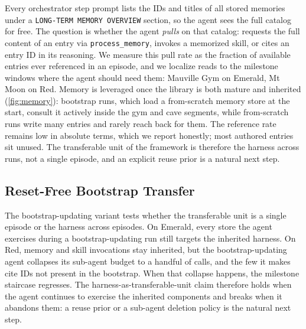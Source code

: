 Every orchestrator step prompt lists the IDs and titles of all stored memories under a \texttt{LONG-TERM MEMORY OVERVIEW} section, so the agent sees the full catalog for free. The question is whether the agent \emph{pulls} on that catalog: requests the full content of an entry via \texttt{process\_memory}, invokes a memorized skill, or cites an entry ID in its reasoning. We measure this pull rate as the fraction of available entries ever referenced in an episode, and we localize reads to the milestone windows where the agent should need them: Mauville Gym on Emerald, Mt Moon on Red. Memory is leveraged once the library is both mature and inherited (\cref{fig:memory}): bootstrap runs, which load a from-scratch memory store at the start, consult it actively inside the gym and cave segments, while from-scratch runs write many entries and rarely reach back for them. The reference rate remains low in absolute terms, which we report honestly; most authored entries sit unused. The transferable unit of the framework is therefore the harness across runs, not a single episode, and an explicit reuse prior is a natural next step.

\subsection{Reset-Free Bootstrap Transfer}\label{app:bootstrap}

The bootstrap-updating variant tests whether the transferable unit is a single episode or the harness across episodes. On Emerald, every store the agent exercises during a bootstrap-updating run still targets the inherited harness. On Red, memory and skill invocations stay inherited, but the bootstrap-updating agent collapses its sub-agent budget to a handful of calls, and the few it makes cite IDs not present in the bootstrap. When that collapse happens, the milestone staircase regresses. The harness-as-transferable-unit claim therefore holds when the agent continues to exercise the inherited components and breaks when it abandons them: a reuse prior or a sub-agent deletion policy is the natural next step.

